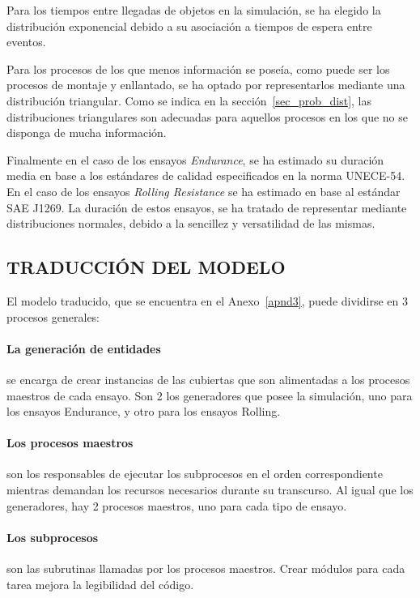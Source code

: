Para los tiempos entre llegadas de objetos en la simulación,
se ha elegido la distribución exponencial debido a
su asociación a tiempos de espera entre eventos.

Para los procesos de los que menos información se poseía,
como puede ser los procesos de montaje y enllantado,
se ha optado por representarlos mediante una distribución triangular.
Como se indica en la sección~\ref{sec_prob_dist},
las distribuciones triangulares son adecuadas para aquellos procesos en los que no se disponga de mucha información.

Finalmente en el caso de los ensayos \textit{Endurance},
se ha estimado su duración media en base a los estándares de calidad
especificados en la norma UNECE-54.
En el caso de los ensayos \textit{Rolling Resistance} se ha estimado en base al estándar SAE J1269.
La duración de estos ensayos,
se ha tratado de representar mediante distribuciones normales,
debido a la sencillez y versatilidad de las mismas.

\subsection{TRADUCCIÓN DEL MODELO}

El modelo traducido, que se encuentra en el Anexo~\ref{apnd3},
puede dividirse en 3 procesos generales:

\paragraph{La generación de entidades}
se encarga de crear instancias de las cubiertas que son alimentadas
a los procesos maestros de cada ensayo.
Son 2 los generadores que posee la simulación,
uno para los ensayos Endurance, y otro para los ensayos Rolling.

\paragraph{Los procesos maestros}
son los responsables de ejecutar los subprocesos
en el orden correspondiente mientras demandan
los recursos necesarios durante su transcurso.
Al igual que los generadores, hay 2 procesos maestros,
uno para cada tipo de ensayo.

\paragraph{Los subprocesos}
son las subrutinas llamadas por los procesos maestros.
Crear módulos para cada tarea mejora la legibilidad del código.

